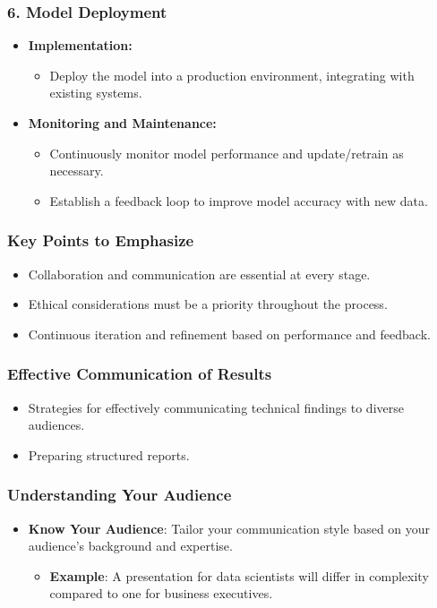 \documentclass[aspectratio=169]{beamer}
\begin{document}
\begin{frame}[fragile]
    \frametitle{6. Model Deployment}
    \begin{itemize}
        \item \textbf{Implementation:}
            \begin{itemize}
                \item Deploy the model into a production environment, integrating with existing systems.
            \end{itemize}
        \item \textbf{Monitoring and Maintenance:}
            \begin{itemize}
                \item Continuously monitor model performance and update/retrain as necessary.
                \item Establish a feedback loop to improve model accuracy with new data.
            \end{itemize}
    \end{itemize}
\end{frame}

\begin{frame}
    \frametitle{Key Points to Emphasize}
    \begin{itemize}
        \item Collaboration and communication are essential at every stage.
        \item Ethical considerations must be a priority throughout the process.
        \item Continuous iteration and refinement based on performance and feedback.
    \end{itemize}
\end{frame}

\begin{frame}[fragile]
    \frametitle{Effective Communication of Results}
    \begin{itemize}
        \item Strategies for effectively communicating technical findings to diverse audiences.
        \item Preparing structured reports.
    \end{itemize}
\end{frame}

\begin{frame}[fragile]
    \frametitle{Understanding Your Audience}
    \begin{itemize}
        \item \textbf{Know Your Audience}: Tailor your communication style based on your audience's background and expertise.
        \begin{itemize}
            \item \textbf{Example}: A presentation for data scientists will differ in complexity compared to one for business executives.
        \end{itemize}
    \end{itemize}
\end{frame}
\end{document}
